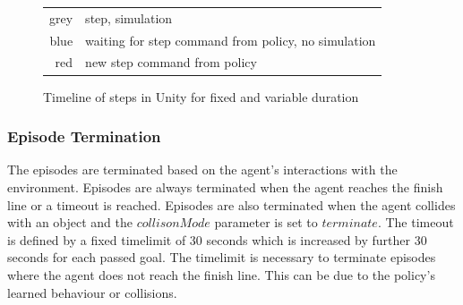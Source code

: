 \begin{figure}[!ht]
    \begin{tabular}{r@{: }l}
        grey & step, simulation                                    \\
        blue & waiting for step command from policy, no simulation \\
        red  & new step command from policy
    \end{tabular}
    \caption{Timeline of steps in Unity for fixed and variable duration}
    \label{fig:unity_timeline_steps_duration}
\end{figure}




\subsubsection{Episode Termination}
\label{time_limit}The episodes are terminated based on the agent's interactions with the environment. Episodes are always terminated when the agent reaches the finish line or a timeout is reached. Episodes are also terminated when the agent collides with an object and the $collisonMode$ parameter is set to $terminate$.
The timeout is defined by a fixed timelimit of 30 seconds which is increased by further 30 seconds for each passed goal. The timelimit is necessary to terminate episodes where the agent does not reach the finish line. This can be due to the policy's learned behaviour or collisions.


